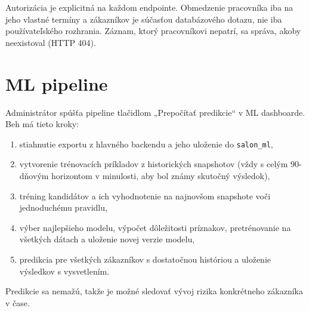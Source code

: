 Autorizácia je explicitná na každom endpointe. Obmedzenie pracovníka iba na jeho vlastné termíny a zákazníkov je súčasťou databázového dotazu, nie iba používateľského rozhrania. Záznam, ktorý pracovníkovi nepatrí, sa správa, akoby neexistoval (HTTP 404).

\section{ML pipeline}

Administrátor spúšťa pipeline tlačidlom „Prepočítať predikcie“ v ML dashboarde. Beh má tieto kroky:

\begin{enumerate}
  \item stiahnutie exportu z hlavného backendu a jeho uloženie do \texttt{salon\_ml},
  \item vytvorenie trénovacích príkladov z historických snapshotov (vždy s celým 90-dňovým horizontom v minulosti, aby bol známy skutočný výsledok),
  \item tréning kandidátov a ich vyhodnotenie na najnovšom snapshote voči jednoduchému pravidlu,
  \item výber najlepšieho modelu, výpočet dôležitosti príznakov, pretrénovanie na všetkých dátach a uloženie novej verzie modelu,
  \item predikcia pre všetkých zákazníkov s dostatočnou históriou a uloženie výsledkov s vysvetlením.
\end{enumerate}

Predikcie sa nemažú, takže je možné sledovať vývoj rizika konkrétneho zákazníka v čase.

